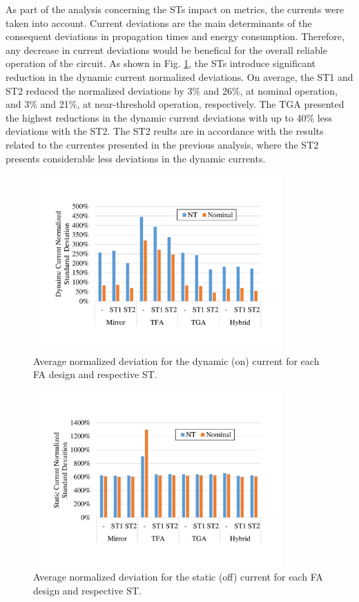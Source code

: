 \documentclass[diss,pgmicro,english]{iiufrgs}
\begin{document}
As part of the analysis concerning the STs impact on metrics, the currents were taken into account. Current deviations are the main determinants of the consequent deviations in propagation times and energy consumption. Therefore, any decrease in current deviations would be benefical for the overall reliable operation of the circuit. As shown in Fig. \ref{fig:onCurrDevFA}, the STs introduce significant reduction in the dynamic current normalized deviations. On average, the ST1 and ST2 reduced the normalized deviations by 3\% and 26\%, at nominal operation, and 3\% and 21\%, at near-threshold operation, respectively. The TGA presented the highest reductions in the dynamic current deviations with up to 40\% less deviations with the ST2. The ST2 reults are in accordance with the results related to the currentes presented in the previous analysis, where the ST2 presents considerable less deviations in the dynamic currents.

\begin{figure}[t]
  \centering
    \includegraphics[width=0.85\textwidth, trim={2cm 3cm 2cm 3cm}, clip]{onCurrDev.pdf}
     \caption{Average normalized deviation for the dynamic (on) current for each FA design and respective ST.}
  \label{fig:onCurrDevFA}
\end{figure}

\begin{figure}[h]
  \centering
    \includegraphics[width=0.85\textwidth, trim={2cm 3cm 2cm 3cm}, clip]{offCurrDev.pdf}
     \caption{Average normalized deviation for the static (off) current for each FA design and respective ST.}
  \label{fig:offCurrDevFA}
\end{figure}
\end{document}
